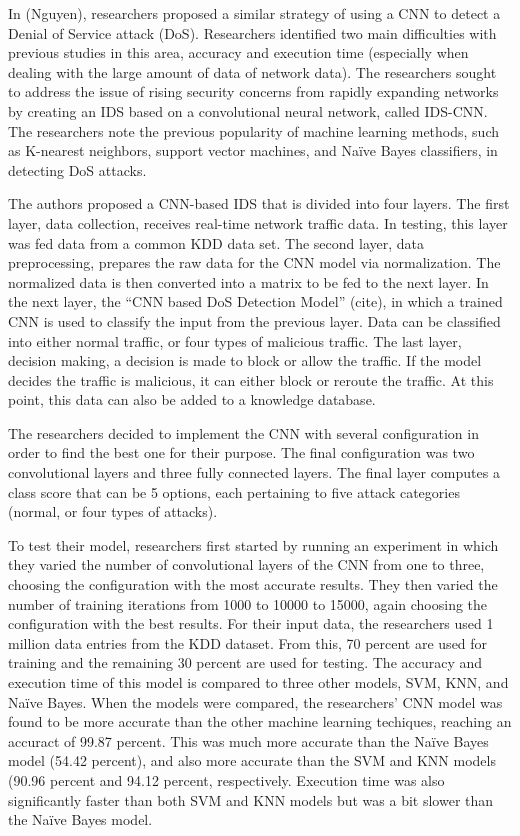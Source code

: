 In (Nguyen), researchers proposed a similar strategy of using a CNN to detect a Denial of Service attack (DoS). Researchers identified two main difficulties with previous studies in this area, accuracy and execution time (especially when dealing with the large amount of data of network data). The researchers sought to address the issue of rising security concerns from rapidly expanding networks by creating an IDS based on a convolutional neural network, called IDS-CNN. The researchers note the previous popularity of machine learning methods, such as K-nearest neighbors, support vector machines, and Naïve Bayes classifiers, in detecting DoS attacks. 

The authors proposed a CNN-based IDS that is divided into four layers. The first layer, data collection, receives real-time network traffic data. In testing, this layer was fed data from a common KDD data set. The second layer, data preprocessing, prepares the raw data for the CNN model via normalization. The normalized data is then converted into a matrix to be fed to the next layer. In the next layer, the “CNN based DoS Detection Model” (cite), in which a trained CNN is used to classify the input from the previous layer. Data can be classified into either normal traffic, or four types of malicious traffic. The last layer, decision making, a decision is made to block or allow the traffic. If the model decides the traffic is malicious, it can either block or reroute the traffic. At this point, this data can also be added to a knowledge database. 

The researchers decided to implement the CNN with several configuration in order to find the best one for their purpose. The final configuration was two convolutional layers and three fully connected layers. The final layer computes a class score that can be 5 options, each pertaining to five attack categories (normal, or four types of attacks). 

To test their model, researchers first started by running an experiment in which they varied the number of convolutional layers of the CNN from one to three, choosing the configuration with the most accurate results. They then varied the number of training iterations from 1000 to 10000 to 15000, again choosing the configuration with the best results. For their input data, the researchers used 1 million data entries from the KDD dataset. From this, 70 percent are used for training and the remaining 30 percent are used for testing. The accuracy and execution time of this model is compared to three other models, SVM, KNN, and Naïve Bayes. 
When the models were compared, the researchers’ CNN model was found to be more accurate than the other machine learning techiques, reaching an accuract of 99.87 percent. This was much more accurate than the Naïve Bayes model (54.42 percent), and also more accurate than the SVM and KNN models (90.96 percent and 94.12 percent, respectively. Execution time was also significantly faster than both SVM and KNN models but was a bit slower than the Naïve Bayes model. 


